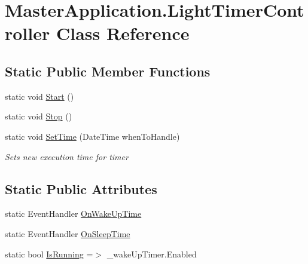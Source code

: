 \hypertarget{class_master_application_1_1_light_timer_controller}{}\section{Master\+Application.\+Light\+Timer\+Controller Class Reference}
\label{class_master_application_1_1_light_timer_controller}
\subsection*{Static Public Member Functions}
\begin{DoxyCompactItemize}
\item 
static void \mbox{\hyperlink{class_master_application_1_1_light_timer_controller_a9453948c870b922fb6a5080847e4ca90}{Start}} ()
\item 
static void \mbox{\hyperlink{class_master_application_1_1_light_timer_controller_a0538817a522b0b7f65c0a85f749e7c8a}{Stop}} ()
\item 
static void \mbox{\hyperlink{class_master_application_1_1_light_timer_controller_a00084f3d19a781b946a4283891765dab}{Set\+Time}} (Date\+Time when\+To\+Handle)
\begin{DoxyCompactList}\small\item\em Sets new execution time for timer \end{DoxyCompactList}\end{DoxyCompactItemize}
\subsection*{Static Public Attributes}
\begin{DoxyCompactItemize}
\item 
static Event\+Handler \mbox{\hyperlink{class_master_application_1_1_light_timer_controller_a34e6c8f85b2c8e61b1967cceccc3e0e4}{On\+Wake\+Up\+Time}}
\item 
static Event\+Handler \mbox{\hyperlink{class_master_application_1_1_light_timer_controller_ad04b63eea25e1d7c00edeb428d12d90f}{On\+Sleep\+Time}}
\item 
static bool \mbox{\hyperlink{class_master_application_1_1_light_timer_controller_a3379e0a8fea84487902f8f5653a47bc8}{Is\+Running}} =$>$ \+\_\+wake\+Up\+Timer.\+Enabled
\end{DoxyCompactItemize}

